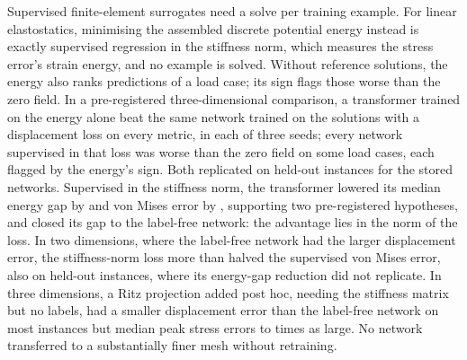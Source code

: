 Supervised finite-element surrogates need a solve per training example. For linear
elastostatics, minimising the assembled discrete potential energy instead is exactly
supervised regression in the stiffness norm, which measures the stress error's strain
energy, and no example is solved. Without reference solutions, the energy also ranks
predictions of a load case; its sign flags those worse than the zero field. In a
pre-registered three-dimensional comparison, a transformer trained on the energy alone beat
the same network trained on the solutions with a displacement loss on every metric, in each
of three seeds; every network supervised in that loss was worse than the zero field on some
load cases, each flagged by the energy's sign. Both replicated on held-out instances for the
stored networks. Supervised in the stiffness norm, the transformer lowered its median energy
gap by \numKdGapRel{} and von Mises error by \numKdVmRel{}, supporting two pre-registered
hypotheses, and closed its gap to the label-free network: the advantage lies in the norm of
the loss. In two dimensions, where the label-free network had the larger displacement error,
the stiffness-norm loss more than halved the supervised von Mises error, also on held-out
instances, where its energy-gap reduction did not replicate. In three dimensions, a Ritz
projection added post hoc, needing the stiffness matrix but no labels, had a smaller
displacement error than the label-free network on most instances but median peak stress
errors \numRitzValPeakRatioMin{} to \numRitzValPeakRatioMax{} times as large. No network
transferred to a substantially finer mesh without retraining.
